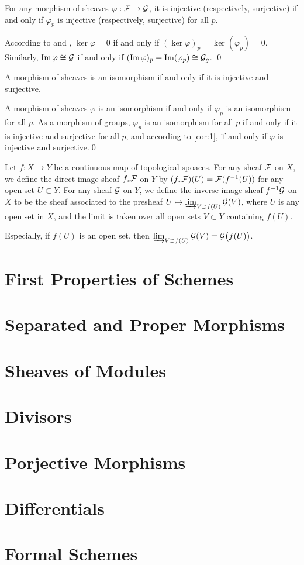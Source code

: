 \documentclass[12pt]{extbook}
\begin{document}
\para  \label{cor:1} For any morphism of sheaves $\varphi:\mathcal{F}\to\mathcal{G}$, it is injective (respectively, surjective) if and only if $\varphi_p$ is injective (respectively, surjective) for all $p$.

\proof According to  and , $\ker \varphi=0$ if and only if $(\ker \varphi)_p=\ker(\varphi_p)=0$. Similarly, $\operatorname{Im} \varphi\cong \mathcal{G}$ if and only if $(\operatorname{Im} \varphi)_p=\operatorname{Im}(\varphi_p)\cong \mathcal{G}_g$. \qed

\para A morphism of sheaves is an isomorphism if and only if it is injective and surjective.

\proof A morphism of sheaves $\varphi$ is an isomorphism if and only if $\varphi_p$ is an isomorphism for all $p$. As a morphism of groups, $\varphi_p$ is an isomorphism for all $p$ if and only if it is injective and surjective for all $p$, and according to \eqref{cor:1}, if and only if $\varphi$ is injective and surjective.\qed

\para Let $f:X\to Y$ be a continuous map of topological spoaces. For any sheaf $\mathcal{F}$ on $X$, we define the direct image sheaf $f_*\mathcal{F}$ on $Y$ by $(f_*\mathcal{F})(U)=\mathcal{F}(f^{-1}(U))$ for any open set $U\subset Y$. For any sheaf $\mathcal{G}$ on $Y$, we define the inverse image sheaf $f^{-1}\mathcal{G}$ on $X$ to be the sheaf associated to the presheaf $U\mapsto \varinjlim_{V \supset f(U)}\mathcal{G}(V)$, where $U$ is any open set in $X$, and the limit is taken over all open sets $V\subset Y$ containing $f(U)$. 

Especially, if $f(U)$ is an open set, then $\varinjlim_{V \supset f(U)}\mathcal{G}(V)=\mathcal{G}\bigl(f(U)\bigr)$.

\section{First Properties of Schemes}
\section{Separated and Proper Morphisms}
\section{Sheaves of Modules}
\section{Divisors}
\section{Porjective Morphisms}
\section{Differentials}
\section{Formal Schemes}
\end{document}
